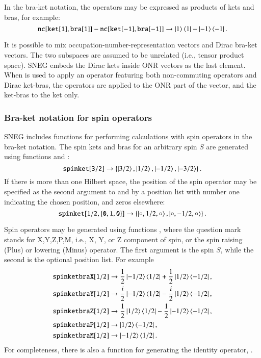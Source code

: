 \documentclass[3p,number,preprint]{elsarticle}
\begin{document}
In the bra-ket notation, the operators may be expressed as
products of kets and bras, for example:
%
\begin{equation}
{\tt nc[ket[1],bra[1]]-nc[ket[-1],bra[-1]]}
\to \left| 1 \right\rangle\left\langle 1 \right| - \left| -1 \right\rangle\left\langle -1 \right|.
\end{equation}

It is possible to mix occupation-number-representation vectors and
Dirac bra-ket vectors. The two subspaces are assumed to be unrelated
(i.e., tensor product space). SNEG embeds the Dirac kets inside ONR
vectors as the last element. When  is used to apply an
operator featuring both non-commuting operators and Dirac ket-bras,
the operators are applied to the ONR part of the vector, and the
ket-bras to the ket only.


\subsubsection{Bra-ket notation for spin operators}

SNEG includes functions for performing calculations with spin
operators in the bra-ket notation. The spin kets and bras for an
arbitrary spin $S$ are generated using functions  and
:
%
\begin{equation}
{\tt spinket[3/2]} \to \left\{ \left| 3/2 \right\rangle, \left| 1/2 \right\rangle, \left| -1/2 \right\rangle,
\left| -3/2 \right\rangle \right\}.
\end{equation}
%
If there is more than one Hilbert space, the position of the spin
operator may be specified as the second argument to  and
 by a position list with number one indicating the chosen
position, and zeros elsewhere:
%
\begin{equation}
{\tt spinket[1/2,\{0,1,0\}]} \to \left\{ \left| \circ,1/2,\circ \right\rangle,
\left| \circ,-1/2,\circ \right\rangle
\right\}.
\end{equation}

Spin operators may be generated using functions ,
where the question mark stands for X,Y,Z,P,M, i.e., X, Y, or Z
component of spin, or the spin raising (Plus) or lowering (Minus)
operator. The first argument is the spin $S$, while the second is
the optional position list. For example
%
\begin{equation}
\begin{split}
{\tt spinketbraX[1/2]} &\to \frac{1}{2} \left| -1/2 \right\rangle \left\langle 1/2 \right|
+\frac{1}{2} \left| 1/2 \right\rangle\left\langle -1/2 \right|, \\
{\tt spinketbraY[1/2]} &\to \frac{i}{2} \left| -1/2 \right\rangle \left\langle 1/2 \right|
-\frac{i}{2} \left| 1/2 \right\rangle\left\langle -1/2 \right|, \\
{\tt spinketbraZ[1/2]} &\to \frac{1}{2} \left| 1/2 \right\rangle \left\langle 1/2 \right|
-\frac{1}{2} \left| -1/2 \right\rangle\left\langle -1/2 \right|, \\
{\tt spinketbraP[1/2]} &\to \left| 1/2 \right\rangle \left\langle -1/2 \right|, \\
{\tt spinketbraM[1/2]} &\to \left| -1/2 \right\rangle \left\langle 1/2 \right|.
\end{split}
\end{equation}
%
For completeness, there is also a function for generating the identity
operator, .
\end{document}
